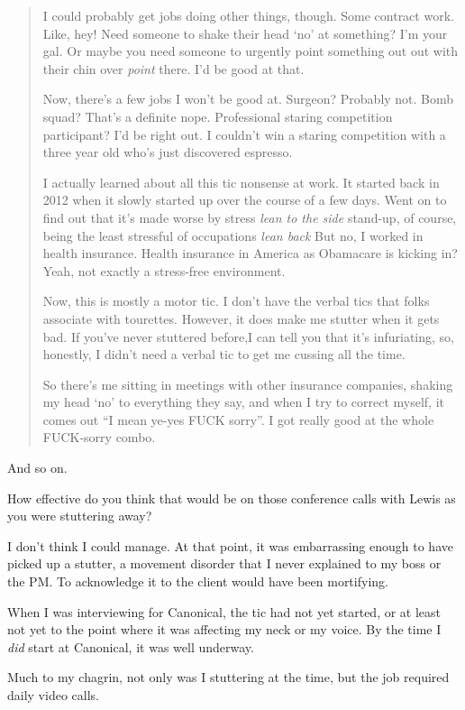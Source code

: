 \begin{paracol}{2}
\begin{leftcolumn}
\begin{quotation}
I could probably get jobs doing other things, though. Some contract work. Like, hey! Need someone to shake their head `no' at something? I'm your gal. Or maybe you need someone to urgently point something out out with their chin over \emph{point} there. I'd be good at that.

Now, there's a few jobs I won't be good at. Surgeon? Probably not. Bomb squad? That's a definite nope. Professional staring competition participant? I'd be right out. I couldn't win a staring competition with a three year old who's just discovered espresso.

I actually learned about all this tic nonsense at work. It started back in 2012 when it slowly started up over the course of a few days. Went on to find out that it's made worse by stress \emph{lean to the side} stand-up, of course, being the least stressful of occupations \emph{lean back} But no, I worked in health insurance. Health insurance in America as Obamacare is kicking in? Yeah, not exactly a stress-free environment.

Now, this is mostly a motor tic. I don't have the verbal tics that folks associate with tourettes. However, it does make me stutter when it gets bad. If you've never stuttered before,I can tell you that it's infuriating, so, honestly, I didn't need a verbal tic to get me cussing all the time.

So there's me sitting in meetings with other insurance companies, shaking my head `no' to everything they say, and when I try to correct myself, it comes out ``I mean ye-yes FUCK sorry''. I got really good at the whole FUCK-sorry combo.
\end{quotation}

And so on.

\begin{ally}
How effective do you think that would be on those conference calls with Lewis as you were stuttering away?
\end{ally}
I don't think I could manage. At that point, it was embarrassing enough to have picked up a stutter, a movement disorder that I never explained to my boss or the PM. To acknowledge it to the client would have been mortifying.
\newpage

\noindent When I was interviewing for Canonical, the tic had not yet started, or at least not yet to the point where it was affecting my neck or my voice. By the time I \emph{did} start at Canonical, it was well underway.

Much to my chagrin, not only was I stuttering at the time, but the job required daily video calls.


\end{leftcolumn}
\end{paracol}
